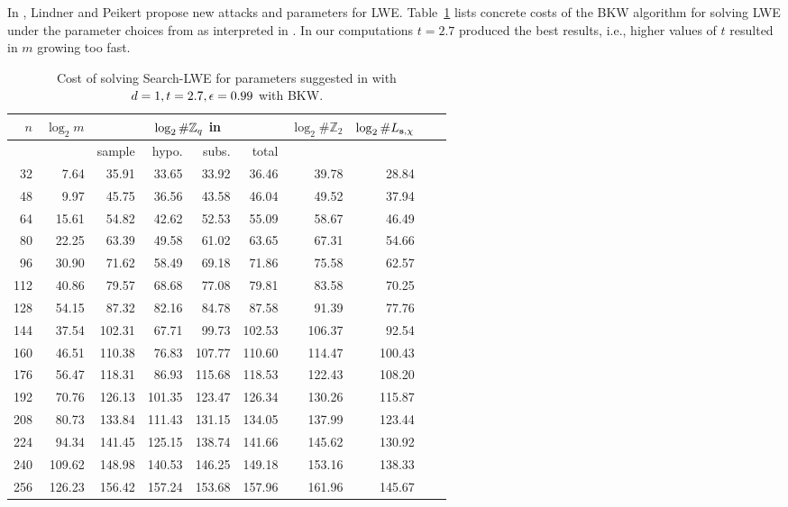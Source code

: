 In \cite{LindnerP10}, Lindner and Peikert propose new attacks and parameters for LWE. Table~\ref{tab:concrete_lp} lists concrete costs of the BKW algorithm for solving LWE under the parameter choices from \cite{LindnerP10} as interpreted in \cite{albrecht-fitzpatrick-cabracas-goepfert-schneider:bitbucket2013}. In our computations $t=2.7$ produced the best results, i.e., higher values of $t$ resulted in $m$ growing too fast.

\begin{table}[!htb]
\begin{center}
\begin{tabular}{|r|r|r|r|r|r|r|r|r|r|} 
\hline
$n$ & $\log_2 m $ & \multicolumn{4}{|c|}{$\log_2 \#\mathbb{Z}_q $ in} & $\log_2 \#\mathbb{Z}_2 $ & $\log_2 \#L_{\mathbf{s},\chi} $\\
\hline
    &                                & sample & hypo. & subs. & total & & \\
\hline
 32 &   7.64 &  35.91 &  33.65 &  33.92 &  36.46 &  39.78 &  28.84\\
 48 &   9.97 &  45.75 &  36.56 &  43.58 &  46.04 &  49.52 &  37.94\\
 64 &  15.61 &  54.82 &  42.62 &  52.53 &  55.09 &  58.67 &  46.49\\
 80 &  22.25 &  63.39 &  49.58 &  61.02 &  63.65 &  67.31 &  54.66\\
 96 &  30.90 &  71.62 &  58.49 &  69.18 &  71.86 &  75.58 &  62.57\\
112 &  40.86 &  79.57 &  68.68 &  77.08 &  79.81 &  83.58 &  70.25\\
128 &  54.15 &  87.32 &  82.16 &  84.78 &  87.58 &  91.39 &  77.76\\
144 &  37.54 & 102.31 &  67.71 &  99.73 & 102.53 & 106.37 &  92.54\\
160 &  46.51 & 110.38 &  76.83 & 107.77 & 110.60 & 114.47 & 100.43\\
176 &  56.47 & 118.31 &  86.93 & 115.68 & 118.53 & 122.43 & 108.20\\
192 &  70.76 & 126.13 & 101.35 & 123.47 & 126.34 & 130.26 & 115.87\\
208 &  80.73 & 133.84 & 111.43 & 131.15 & 134.05 & 137.99 & 123.44\\
224 &  94.34 & 141.45 & 125.15 & 138.74 & 141.66 & 145.62 & 130.92\\
240 & 109.62 & 148.98 & 140.53 & 146.25 & 149.18 & 153.16 & 138.33\\
256 & 126.23 & 156.42 & 157.24 & 153.68 & 157.96 & 161.96 & 145.67\\
\hline                                                                                                 
\end{tabular}
\end{center}
\caption{Cost of solving Search-LWE for parameters suggested in \cite{LindnerP10} with $d=1,t=2.7, \epsilon=0.99$ with BKW.}
\label{tab:concrete_lp}
\end{table}

